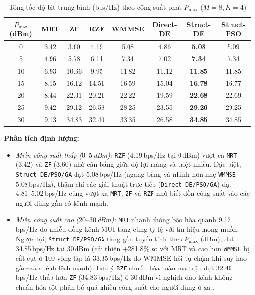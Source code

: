 \documentclass[12pt, a4paper]{article}
\begin{document}
\begin{table}[H]
    \centering
    \caption{Tổng tốc độ bit trung bình (bps/Hz) theo công suất phát $P_{\max}$ ($M=8, K=4$)}
    \label{tab:power}
    \begin{tabular}{c c c c c c c c}
        \toprule
        \textbf{$P_{\max}$ (dBm)} & \textbf{MRT} & \textbf{ZF} & \textbf{RZF} & \textbf{WMMSE} & \textbf{Direct-DE} & \textbf{Struct-DE} & \textbf{Struct-PSO} \\
        \midrule
        0 & 3.42 & 3.60 & 4.19 & 5.08 & 4.86 & \textbf{5.08} & 5.09 \\
        5 & 4.96 & 5.78 & 6.11 & 7.34 & 7.02 & \textbf{7.34} & 7.34 \\
        10 & 6.93 & 10.66 & 9.95 & 11.82 & 11.12 & \textbf{11.85} & 11.85 \\
        15 & 8.15 & 16.12 & 14.51 & 16.59 & 15.04 & \textbf{16.78} & 16.77 \\
        20 & 8.44 & 22.31 & 20.21 & 22.22 & 19.59 & \textbf{22.68} & 22.69 \\
        25 & 9.42 & 29.12 & 26.58 & 28.25 & 23.55 & \textbf{29.26} & 29.25 \\
        30 & 9.13 & 34.83 & 32.40 & 33.35 & 26.58 & \textbf{34.85} & 34.85 \\
        \bottomrule
    \end{tabular}
\end{table}

\textbf{Phân tích định lượng:}
\begin{itemize}
    \item \emph{Miền công suất thấp ($0\text{--}5$\,dBm):} \texttt{RZF} (4.19\,bps/Hz tại $0$\,dBm) vượt cả \texttt{MRT} (3.42) và \texttt{ZF} (3.60) nhờ cân bằng giữa độ lợi mảng và triệt nhiễu. Đặc biệt, \texttt{Struct-DE/PSO/GA} đạt 5.08\,bps/Hz (ngang bằng và nhỉnh hơn nhẹ \texttt{WMMSE} 5.08\,bps/Hz), thậm chí các giải thuật trực tiếp (\texttt{Direct-DE/PSO/GA}) đạt $4.86\text{--}5.02$\,bps/Hz cũng vượt xa \texttt{MRT}, \texttt{ZF} và \texttt{RZF} nhờ biết dồn công suất vào các người dùng gần có kênh mạnh.
    \item \emph{Miền công suất cao ($20\text{--}30$\,dBm):} \texttt{MRT} nhanh chóng bão hòa quanh 9.13\,bps/Hz do nhiễu đồng kênh MUI tăng cùng tỷ lệ với tín hiệu mong muốn. Ngược lại, \texttt{Struct-DE/PSO/GA} tăng gần tuyến tính theo $P_{\max}$ (dBm), đạt 34.85\,bps/Hz tại $30$\,dBm (cải thiện +281.8\% so với MRT và cao hơn \texttt{WMMSE} bị cắt cụt ở 100 vòng lặp là 33.35\,bps/Hz do WMMSE hội tụ chậm khi suy hao gần--xa chênh lệch mạnh). Lưu ý \texttt{RZF} chuẩn hóa toàn ma trận đạt 32.40\,bps/Hz thấp hơn \texttt{ZF} (34.83\,bps/Hz) ở $30$\,dBm vì nghịch đảo kênh không chuẩn hóa cột phân bổ quá nhiều công suất cho người dùng ở xa \cite{peel2005}.
\end{itemize}
\end{document}
